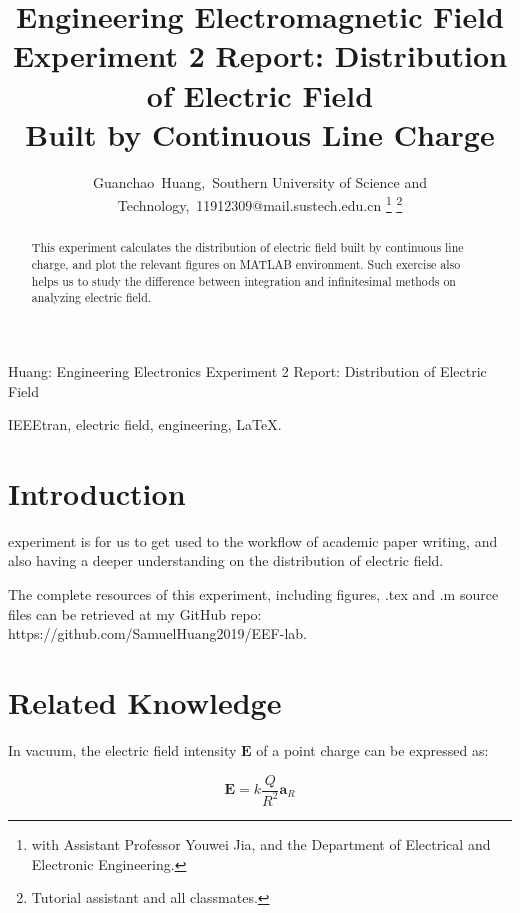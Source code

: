 \documentclass[journal]{IEEEtran}
\begin{document}
\title{Engineering Electromagnetic Field \\ Experiment 2 Report: Distribution of Electric Field \\ Built by Continuous Line Charge}

\author{Guanchao~Huang,~Southern University of Science and Technology,~11912309@mail.sustech.edu.cn
    \thanks{with Assistant Professor Youwei Jia, and the Department of Electrical  and Electronic Engineering.}%
    \thanks{Tutorial assistant and all classmates.}}%


%
{Huang: Engineering Electronics Experiment 2 Report: Distribution of Electric Field}
\maketitle


\begin{abstract}
    This experiment calculates the distribution of electric field built by continuous line charge, and plot the relevant figures on MATLAB environment. Such exercise also helps us to study the difference between integration and infinitesimal methods on analyzing electric field.
\end{abstract}


\begin{IEEEkeywords}
    IEEEtran, electric field, engineering, \LaTeX.
\end{IEEEkeywords}


\section{Introduction}

 experiment is for us to get used to the workflow of academic paper writing, and also having a deeper understanding on the distribution of electric field.

The complete resources of this experiment, including figures, .tex and .m source files can be retrieved at my GitHub repo: https://github.com/SamuelHuang2019/EEF-lab.


\section{Related Knowledge}

In vacuum, the electric field intensity $\mathbf{E}$ of a point charge can be expressed as:

\begin{equation}\label{e1}
    \mathbf{E} = k\frac{Q}{R^2}\mathbf{a}_R
\end{equation}
\end{document}
